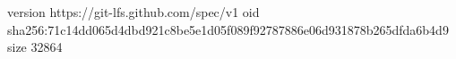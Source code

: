 version https://git-lfs.github.com/spec/v1
oid sha256:71c14dd065d4dbd921c8be5e1d05f089f92787886e06d931878b265dfda6b4d9
size 32864
